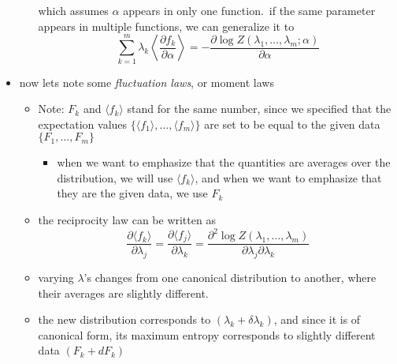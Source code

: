 \documentclass[../jaynes_prob_theory_notes.tex]{subfiles}
\begin{document}
\begin{itemize}
\begin{itemize}
                                which assumes \( \alpha \) appears in only one function.\ if the same parameter appears in multiple functions, we can generalize it to
                                \begin{equation*} 
                                    \sum\limits^{m}_{k=1} \lambda_k \left \langle \frac{\partial f_k}{\partial \alpha} \right \rangle = - \frac{\partial \log Z(\lambda_1, \ldots, \lambda_m ; \alpha)}{\partial \alpha}
                                \end{equation*}
                        \end{itemize}
                    \item now lets note some \textit{fluctuation laws}, or moment laws
                        \begin{itemize} 
                            \item Note: \( F_k \) and \( \langle f_k \rangle \) stand for the same number, since we specified that the expectation values \( \{ \langle f_1 \rangle, \ldots, \langle f_m \rangle \} \) are set to be equal to the given data \( \{F_1, \ldots, F_m \} \)
                                \begin{itemize} 
                                    \item when we want to emphasize that the quantities are averages over the distribution, we will use \( \langle f_k \rangle \), and when we want to emphasize that they are the given data, we use \( F_k \)
                                \end{itemize}
                            \item the reciprocity law can be written as
                                \begin{equation*} 
                                    \frac{\partial \langle f_k \rangle}{\partial \lambda_j} = \frac{\partial \langle f_j \rangle}{\partial \lambda_k} = \frac{\partial^2 \log Z(\lambda_1, \ldots, \lambda_m)}{\partial \lambda_j \partial \lambda_k}
                                \end{equation*}
                            \item varying \(\lambda\)'s changes from one canonical distribution to another, where their averages are slightly different. 
                            \item the new distribution corresponds to \( (\lambda_k + \delta \lambda_k) \), and since it is of canonical form, its maximum entropy corresponds to slightly different data \( (F_k + d F_k) \)

\end{itemize}
\end{itemize}
\end{document}
